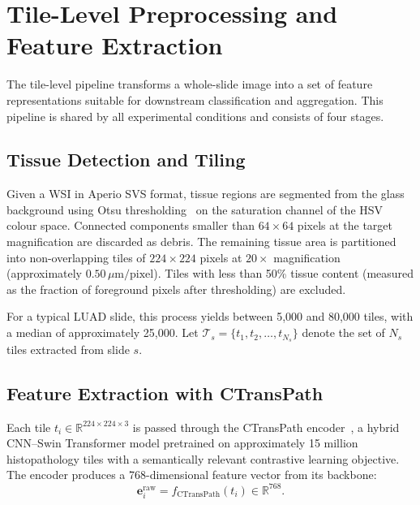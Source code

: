 \section{Tile-Level Preprocessing and Feature Extraction}
\label{sec:meth:tile_pipeline}

The tile-level pipeline transforms a whole-slide image into a set of feature representations suitable for downstream classification and aggregation.
This pipeline is shared by all experimental conditions and consists of four stages.

\subsection{Tissue Detection and Tiling}
\label{sec:meth:tiling}

Given a WSI in Aperio SVS format, tissue regions are segmented from the glass background using Otsu thresholding~\cite{otsu1979threshold} on the saturation channel of the HSV colour space.
Connected components smaller than $64 \times 64$ pixels at the target magnification are discarded as debris.
The remaining tissue area is partitioned into non-overlapping tiles of $224 \times 224$ pixels at $20\times$ magnification (approximately $0.50\,\mu\text{m/pixel}$).
Tiles with less than 50\% tissue content (measured as the fraction of foreground pixels after thresholding) are excluded.

For a typical LUAD slide, this process yields between 5{,}000 and 80{,}000 tiles, with a median of approximately 25{,}000.
Let $\mathcal{T}_s = \{t_1, t_2, \ldots, t_{N_s}\}$ denote the set of $N_s$ tiles extracted from slide $s$.

\subsection{Feature Extraction with CTransPath}
\label{sec:meth:ctranspath_extraction}

Each tile $t_i \in \mathbb{R}^{224 \times 224 \times 3}$ is passed through the CTransPath encoder~\cite{wang2022ctranspath}, a hybrid CNN--Swin Transformer model pretrained on approximately 15 million histopathology tiles with a semantically relevant contrastive learning objective.
The encoder produces a 768-dimensional feature vector from its backbone:
\begin{equation}
\label{eq:ctranspath_backbone}
\mathbf{e}_i^{\text{raw}} = f_{\text{CTransPath}}(t_i) \in \mathbb{R}^{768}.
\end{equation}

